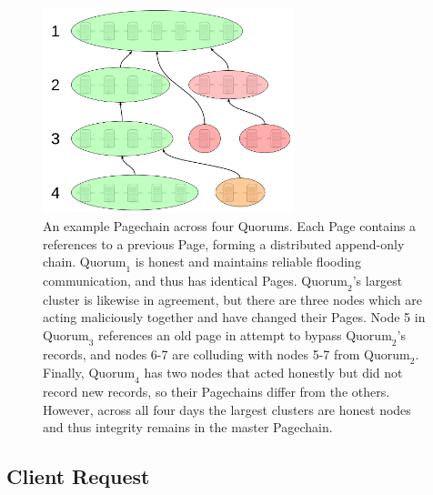 \begin{figure}[htbp]
	\centering
	\includegraphics[width=0.65\textwidth]{images/LucidCharts/Page-chain.png}
	\caption{An example Pagechain across four Quorums. Each Page contains a references to a previous Page, forming a distributed append-only chain. $ \mathrm{Quorum}_{1} $ is honest and maintains reliable flooding communication, and thus has identical Pages. $ \mathrm{Quorum}_{2} $'s largest cluster is likewise in agreement, but there are three nodes which are acting maliciously together and have changed their Pages. Node 5 in $ \mathrm{Quorum}_{3} $ references an old page in attempt to bypass $ \mathrm{Quorum}_{2} $'s records, and nodes 6-7 are colluding with nodes 5-7 from $ \mathrm{Quorum}_{2} $. Finally, $ \mathrm{Quorum}_{4} $ has two nodes that acted honestly but did not record new records, so their Pagechains differ from the others. However, across all four days the largest clusters are honest nodes and thus integrity remains in the master Pagechain.}
	\label{fig:sidechains}
\end{figure}














\subsection{Client Request}

